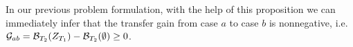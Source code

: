 In our previous problem formulation, with the help of this proposition we can immediately infer that the transfer gain from case $a$ to case $b$ is nonnegative, i.e. $\mathcal{G}_{ab} = \mathcal{B}_{T_2}(Z_{T_1}) - \mathcal{B}_{T_2}(\emptyset) \geq 0$. %

